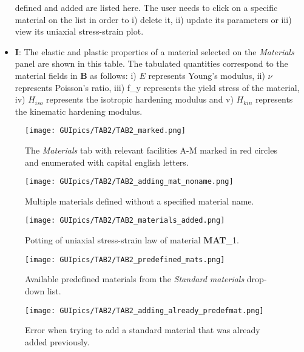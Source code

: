 \begin{itemize}
	defined and added are listed here. The user needs to click on a specific 
	material on the list in order to i) delete it, ii) update its parameters or 
	iii) view its uniaxial stress-strain plot.
	\item \textbf{I}: The elastic and plastic properties of a material selected 
	on the \textit{Materials} panel are shown in this table. The tabulated 
	quantities correspond to the material fields in \textbf{B} as follows:
		i) $E$ represents Young's modulus, ii) $\nu$ represents Poisson's 
		ratio, iii) f\_y represents the yield stress of the material, iv) 
		$H_{iso}$ represents the isotropic hardening modulus and v) $H_{kin}$ 
		represents the kinematic hardening modulus.
\end{itemize}

\begin{figure}
	\centering
	\texttt{[image: GUIpics/TAB2/TAB2\_marked.png]}
	\caption{The \textit{Materials} tab with relevant facilities A-M marked in 
	red circles 
		and enumerated with capital english letters.}
	\label{fig:TAB2_marked}
\end{figure}


\begin{figure}
	\centering
	\texttt{[image: GUIpics/TAB2/TAB2\_adding\_mat\_noname.png]}
	\caption{Multiple materials defined without a specified material name.}
	\label{fig:TAB2_adding_mat_noname}
\end{figure}

\begin{figure}
	\centering
	\texttt{[image: GUIpics/TAB2/TAB2\_materials\_added.png]}
	\caption{Potting of uniaxial stress-strain law of material \textbf{MAT}\_1.}
	\label{fig:TAB2_materials_added}
\end{figure}

\begin{figure}
	\centering
	\texttt{[image: GUIpics/TAB2/TAB2\_predefined\_mats.png]}
	\caption{Available predefined materials from the \textit{Standard 
	materials} drop-down list.}
	\label{fig:TAB2_predefined_mats}
\end{figure}

\begin{figure}
	\centering
	\texttt{[image: GUIpics/TAB2/TAB2\_adding\_already\_predefmat.png]}
	\caption{Error when trying to add a standard material that was already 
	added previously.}
	\label{fig:TAB2_adding_already_predefmat}
\end{figure}

